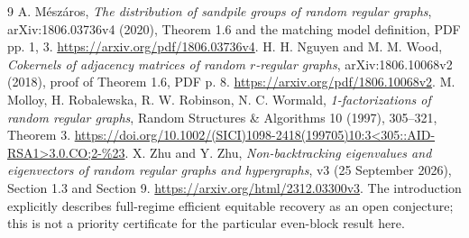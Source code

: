 \documentclass[11pt]{article}
\begin{document}
\begin{thebibliography}{9}
 A. M\'esz\'aros, \emph{The distribution of sandpile groups of
random regular graphs}, arXiv:1806.03736v4 (2020), Theorem 1.6 and
the matching model definition, PDF pp. 1, 3.
\url{https://arxiv.org/pdf/1806.03736v4}.
 H. H. Nguyen and M. M. Wood, \emph{Cokernels of adjacency
matrices of random $r$-regular graphs}, arXiv:1806.10068v2 (2018),
proof of Theorem 1.6, PDF p. 8.
\url{https://arxiv.org/pdf/1806.10068v2}.
 M. Molloy, H. Robalewska, R. W. Robinson, N. C. Wormald,
\emph{1-factorizations of random regular graphs}, Random Structures
\& Algorithms 10 (1997), 305--321, Theorem 3.
\url{https://doi.org/10.1002/(SICI)1098-2418(199705)10:3<305::AID-RSA1>3.0.CO;2-\%23}.
 X. Zhu and Y. Zhu, \emph{Non-backtracking eigenvalues and
eigenvectors of random regular graphs and hypergraphs}, v3 (25 September
2026), Section 1.3 and Section 9.
\url{https://arxiv.org/html/2312.03300v3}.
The introduction explicitly describes full-regime efficient equitable
recovery as an open conjecture; this is not a priority certificate for
the particular even-block result here.
\end{thebibliography}
\end{document}

